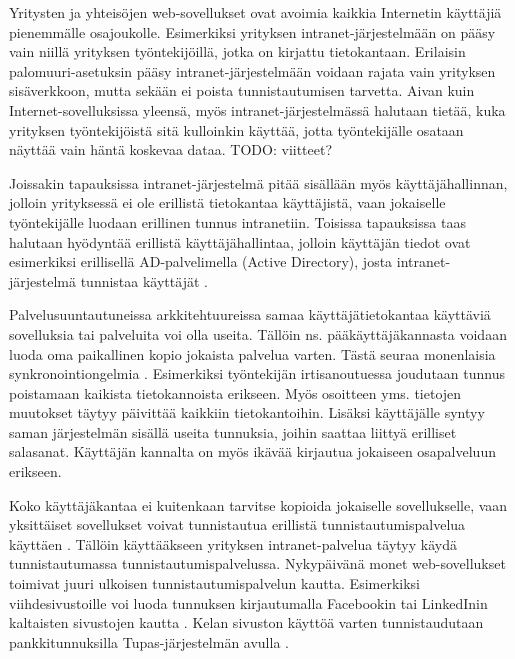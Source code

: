 Yritysten ja yhteisöjen web-sovellukset ovat avoimia kaikkia Internetin käyttäjiä pienemmälle osajoukolle. Esimerkiksi yrityksen intranet-järjestelmään on pääsy vain niillä yrityksen työntekijöillä, jotka on kirjattu tietokantaan. Erilaisin palomuuri-asetuksin pääsy intranet-järjestelmään voidaan rajata vain yrityksen sisäverkkoon, mutta sekään ei poista tunnistautumisen tarvetta. Aivan kuin Internet-sovelluksissa yleensä, myös intranet-järjestelmässä halutaan tietää, kuka yrityksen työntekijöistä sitä kulloinkin käyttää, jotta työntekijälle osataan näyttää vain häntä koskevaa dataa. TODO: viitteet?

Joissakin tapauksissa intranet-järjestelmä pitää sisällään myös käyttäjähallinnan, jolloin yrityksessä ei ole erillistä tietokantaa käyttäjistä, vaan jokaiselle työntekijälle luodaan erillinen tunnus intranetiin. Toisissa tapauksissa taas halutaan hyödyntää erillistä käyttäjähallintaa, jolloin käyttäjän tiedot ovat esimerkiksi erillisellä AD-palvelimella (Active Directory), josta intranet-järjestelmä tunnistaa käyttäjät \cite{active_directory}.

Palvelusuuntautuneissa arkkitehtuureissa samaa käyttäjätietokantaa käyttäviä sovelluksia tai palveluita voi olla useita. Tällöin ns. pääkäyttäjäkannasta voidaan luoda oma paikallinen kopio jokaista palvelua varten. Tästä seuraa monenlaisia synkronointiongelmia \cite{synkronointi}. Esimerkiksi työntekijän irtisanoutuessa joudutaan tunnus poistamaan kaikista tietokannoista erikseen. Myös osoitteen yms. tietojen muutokset täytyy päivittää kaikkiin tietokantoihin. Lisäksi käyttäjälle syntyy saman järjestelmän sisällä useita tunnuksia, joihin saattaa liittyä erilliset salasanat. Käyttäjän kannalta on myös ikävää kirjautua jokaiseen osapalveluun erikseen.

Koko käyttäjäkantaa ei kuitenkaan tarvitse kopioida jokaiselle sovellukselle, vaan yksittäiset sovellukset voivat tunnistautua erillistä tunnistautumispalvelua käyttäen \cite{facebook}. Tällöin käyttääkseen yrityksen intranet-palvelua täytyy käydä tunnistautumassa tunnistautumispalvelussa. Nykypäivänä monet web-sovellukset toimivat juuri ulkoisen tunnistautumispalvelun kautta. Esimerkiksi viihdesivustoille voi luoda tunnuksen kirjautumalla Facebookin tai LinkedInin kaltaisten sivustojen kautta \cite{facebook}. Kelan sivuston käyttöä varten tunnistaudutaan pankkitunnuksilla Tupas-järjestelmän avulla \cite{tupas}.
